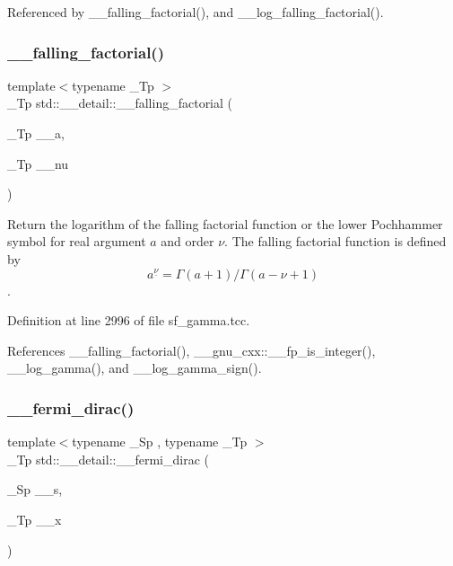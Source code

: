 Referenced by \+\_\+\+\_\+falling\+\_\+factorial(), and \+\_\+\+\_\+log\+\_\+falling\+\_\+factorial().

\mbox{\label{namespacestd_1_1____detail_a7cde2bf518e7ea3a0db2bec8f41b6465}} 
\subsubsection{\texorpdfstring{\+\_\+\+\_\+falling\+\_\+factorial()}{\_\_falling\_factorial()}\hspace{0.1cm}{\footnotesize\ttfamily [2/2]}}
{\footnotesize\ttfamily template$<$typename \+\_\+\+Tp $>$ \\
\+\_\+\+Tp std\+::\+\_\+\+\_\+detail\+::\+\_\+\+\_\+falling\+\_\+factorial (\begin{DoxyParamCaption}\item[{\+\_\+\+Tp}]{\+\_\+\+\_\+a,  }\item[{\+\_\+\+Tp}]{\+\_\+\+\_\+nu }\end{DoxyParamCaption})}



Return the logarithm of the falling factorial function or the lower Pochhammer symbol for real argument $ a $ and order $ \nu $. The falling factorial function is defined by \[ a^{\underline{\nu}} = \Gamma(a + 1) / \Gamma(a - \nu + 1) \]. 



Definition at line 2996 of file sf\+\_\+gamma.\+tcc.



References \+\_\+\+\_\+falling\+\_\+factorial(), \+\_\+\+\_\+gnu\+\_\+cxx\+::\+\_\+\+\_\+fp\+\_\+is\+\_\+integer(), \+\_\+\+\_\+log\+\_\+gamma(), and \+\_\+\+\_\+log\+\_\+gamma\+\_\+sign().

\mbox{\label{namespacestd_1_1____detail_a470e563c4e88c433f94dca391814dc61}} 
\subsubsection{\texorpdfstring{\+\_\+\+\_\+fermi\+\_\+dirac()}{\_\_fermi\_dirac()}}
{\footnotesize\ttfamily template$<$typename \+\_\+\+Sp , typename \+\_\+\+Tp $>$ \\
\+\_\+\+Tp std\+::\+\_\+\+\_\+detail\+::\+\_\+\+\_\+fermi\+\_\+dirac (\begin{DoxyParamCaption}\item[{\+\_\+\+Sp}]{\+\_\+\+\_\+s,  }\item[{\+\_\+\+Tp}]{\+\_\+\+\_\+x }\end{DoxyParamCaption})}

